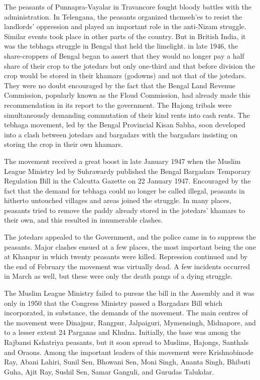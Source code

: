 The peasants of Punnapra-Vayalar in Travancore fought bloody battles with the administration. In Telengana, the peasants organized thcmseh'es to resist the landlords' oppression and played an important role in the anti-Nizam struggle. Similar events took place in other parts of the country. But in British India, it was the tebhaga struggle in Bengal that held the limelight. in late 1946, the share-croppers of Bengal began to assert that they would no longer pay a half share of their crop to the jotedars but only one-third and that before division the crop would be stored in their khamars (godowns) and not that of the jotedars. They were no doubt encouraged by the fact that the Bengal Land Revenue Commission, popularly known as the Floud Commission, had already made this recommendation in its report to the government. The Hajong tribals were simultaneously demanding commutation of their kind rents into cash rents. The tebhaga movement, led by the Bengal Provincial Kisan Sabha, soon developed into a clash between jotedars and bargadars with the bargadars insisting on storing the crop in their own khamars.

The movement received a great boost in late January 1947 when the Muslim League Ministry led by Suhrawardy published the Bengal Bargadars Temporary Regulation Bill in the Calcutta Gazette on 22 January 1947. Encouraged by the fact that the demand for tebhaga could no longer be called illegal, peasants in hitherto untouched villages and areas joined the struggle. In many places, peasants tried to remove the paddy already stored in the jotedars' khamars to their own, and this resulted in innumerable clashes.

The jotedars appealed to the Government, and the police came in to suppress the peasants. Major clashes ensued at a few places, the most important being the one at Khanpur in which twenty peasants were killed. Repression continued and by the end of February the movement was virtually dead. A few incidents occurred in March as well, but these were only the death pangs of a dying struggle.

The Muslim League Ministry failed to pursue the bill in the Assembly and it was only in 1950 that the Congress Ministry passed a Bargadars Bill which incorporated, in substance, the demands of the movement. The main centres of the movement were Dinajpur, Rangpur, Jalpaiguri, Mymensingh, Midnapore, and to a lesser extent 24­ Parganas and Khulna. Initially, the base was among the Rajbansi Kshatriya peasants, but it soon spread to Muslims, Hajongs, Santhals and Oraons. Among the important leaders of this movement were Krishnobinode Ray, Abani Lahiri, Sunil Sen, Bhowani Sen, Moni Singh, Ananta Singh, Bhibuti Guha, Ajit Ray, Sushil Sen, Samar Ganguli, and Gurudas Talukdar.

